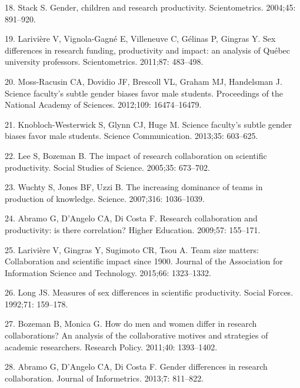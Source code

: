 \documentclass[12pt,]{article}
\begin{document}
\leavevmode\hypertarget{ref-Stack_2004}{}%
18. Stack S. Gender, children and research productivity. Scientometrics.
2004;45: 891--920.

\leavevmode\hypertarget{ref-Lariviere_2011}{}%
19. Larivière V, Vignola-Gagné E, Villeneuve C, Gélinas P, Gingras Y.
Sex differences in research funding, productivity and impact: an
analysis of Québec university professors. Scientometrics. 2011;87:
483--498.

\leavevmode\hypertarget{ref-Moss_2012}{}%
20. Moss-Racusin CA, Dovidio JF, Brescoll VL, Graham MJ, Handelsman J.
Science faculty's subtle gender biases favor male students. Proceedings
of the National Academy of Sciences. 2012;109: 16474--16479.

\leavevmode\hypertarget{ref-Knobloch_2013}{}%
21. Knobloch-Westerwick S, Glynn CJ, Huge M. Science faculty's subtle
gender biases favor male students. Science Communication. 2013;35:
603--625.

\leavevmode\hypertarget{ref-Lee_2005}{}%
22. Lee S, Bozeman B. The impact of research collaboration on scientific
productivity. Social Studies of Science. 2005;35: 673--702.

\leavevmode\hypertarget{ref-Wuchty_2007}{}%
23. Wuchty S, Jones BF, Uzzi B. The increasing dominance of teams in
production of knowledge. Science. 2007;316: 1036--1039.

\leavevmode\hypertarget{ref-Abramo_2009}{}%
24. Abramo G, D'Angelo CA, Di Costa F. Research collaboration and
productivity: is there correlation? Higher Education. 2009;57: 155--171.

\leavevmode\hypertarget{ref-Lariviere_2015}{}%
25. Larivière V, Gingras Y, Sugimoto CR, Tsou A. Team size matters:
Collaboration and scientific impact since 1900. Journal of the
Association for Information Science and Technology. 2015;66: 1323--1332.

\leavevmode\hypertarget{ref-Long_1992}{}%
26. Long JS. Measures of sex differences in scientific productivity.
Social Forces. 1992;71: 159--178.

\leavevmode\hypertarget{ref-Bozeman_2011}{}%
27. Bozeman B, Monica G. How do men and women differ in research
collaborations? An analysis of the collaborative motives and strategies
of academic researchers. Research Policy. 2011;40: 1393--1402.

\leavevmode\hypertarget{ref-Abramo_2013}{}%
28. Abramo G, D'Angelo CA, Di Costa F. Gender differences in research
collaboration. Journal of Informetrics. 2013;7: 811--822.
\end{document}
